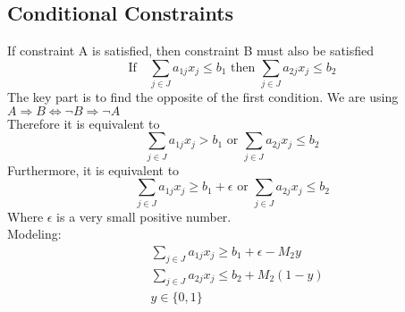 			\subsection{Conditional Constraints}
				If constraint A is satisfied, then constraint B must also be satisfied
				\begin{equation}
					\text{If} \quad \sum_{j\in J} a_{1j} x_j \le b_1 \text{ then } \sum_{j\in J} a_{2j} x_j \le b_2 
				\end{equation}
				The key part is to find the opposite of the first condition. We are using $A\Rightarrow B \Leftrightarrow \neg B \Rightarrow \neg A$\\
				Therefore it is equivalent to
				\begin{equation}
					\sum_{j\in J} a_{1j} x_j > b_1 \text{ or } \sum_{j\in J} a_{2j} x_j \le b_2 
				\end{equation}
				Furthermore, it is equivalent to
				\begin{equation}
					\sum_{j\in J} a_{1j} x_j \ge b_1 + \epsilon \text{ or } \sum_{j\in J} a_{2j} x_j \le b_2 
				\end{equation}
				Where $\epsilon$ is a very small positive number.\\
				Modeling:
				\begin{align}
					& \sum_{j\in J} a_{1j} x_j \ge b_1 + \epsilon -  M_2y  \\
					& \sum_{j\in J} a_{2j} x_j \le b_2 + M_2(1-y)  \\
					& y \in \{0, 1\} 
				\end{align}

